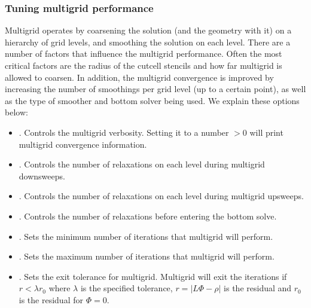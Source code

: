 \documentclass[letterpaper,10pt,english]{sphinxmanual}
\begin{document}
\subsubsection{Tuning multigrid performance}
\label{\detokenize{Solvers/Electrostatics:tuning-multigrid-performance}}
Multigrid operates by coarsening the solution (and the geometry with it) on a hierarchy of grid levels, and smoothing the solution on each level.
There are a number of factors that influence the multigrid performance.
Often the most critical factors are the radius of the cut\sphinxhyphen{}cell stencils and how far multigrid is allowed to coarsen.
In addition, the multigrid convergence is improved by increasing the number of smoothings per grid level (up to a certain point), as well as the type of smoother and bottom solver being used.
We explain these options below:
\begin{itemize}
\item {} 
.
Controls the multigrid verbosity.
Setting it to a number \(> 0\) will print multigrid convergence information.

\item {} 
.
Controls the number of relaxations on each level during multigrid downsweeps.

\item {} 
.
Controls the number of relaxations on each level during multigrid upsweeps.

\item {} 
.
Controls the number of relaxations before entering the bottom solve.

\item {} 
.
Sets the minimum number of iterations that multigrid will perform.

\item {} 
.
Sets the maximum number of iterations that multigrid will perform.

\item {} 
.
Sets the exit tolerance for multigrid.
Multigrid will exit the iterations if \(r < \lambda r_0\) where \(\lambda\) is the specified tolerance, \(r = |L\Phi -\rho|\) is the residual and \(r_0\) is the residual for \(\Phi = 0\).


\end{itemize}
\end{document}
